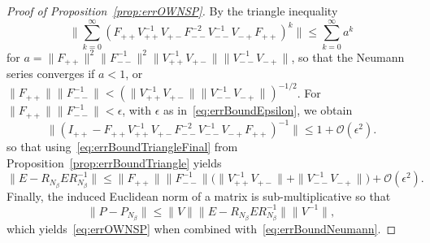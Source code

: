 \begin{proof}[Proof of Proposition~\ref{prop:errOWNSP}]
    By the triangle inequality
    \[
    \|\sum_{k=0}^\infty(F_{++}V_{++}^{-1}V_{+-}F_{--}^{-2}
    V_{--}^{-1}V_{-+}F_{++})^k\|\leq \sum_{k=0}^\infty a^k
    \]
    for $a=\|F_{++}\|^2\|F_{--}^{-1}\|^2\|V_{++}^{-1}V_{+-}\|
    \|V_{--}^{-1}V_{-+}\|$, so that the Neumann series converges if $a<1$, or
    $\|F_{++}\|\|F_{--}^{-1}\|<(\|V_{++}^{-1}V_{+-}\|
    \|V_{--}^{-1}V_{-+}\|)^{-1/2}$. For $\|F_{++}\|\|F_{--}^{-1}\|<\epsilon$,
    with $\epsilon$ as in~\eqref{eq:errBoundEpsilon}, we obtain
    \[
        \|(I_{++}-F_{++}V_{++}^{-1}V_{+-}F_{--}^{-2}V_{--}^{-1}
        V_{-+}F_{++})^{-1}\|\leq1+\mathcal{O}(\epsilon^2).
    \]
    so that using~\eqref{eq:errBoundTriangleFinal} from
    Proposition~\eqref{prop:errBoundTriangle} yields
    \begin{equation}
        \|E-R_{N_\beta}ER_{N_\beta}^{-1}\|\leq
        \|F_{++}\|\|F_{--}^{-1}\|\big(\|V_{++}^{-1}V_{+-}\|+\|V_{--}^{-1}
        V_{-+}\|\big)+\mathcal{O}(\epsilon^2).
        \label{eq:errBoundNeumann}
    \end{equation}
    Finally, the induced Euclidean norm of a matrix is sub-multiplicative so
    that
    \[
    \|P-P_{N_\beta}\|\leq \|V\| \|E-R_{N_\beta}ER_{N_\beta}^{-1}\| \|V^{-1}\|,
    \]
    which yields~\eqref{eq:errOWNSP} when combined
    with~\eqref{eq:errBoundNeumann}.
\end{proof}

